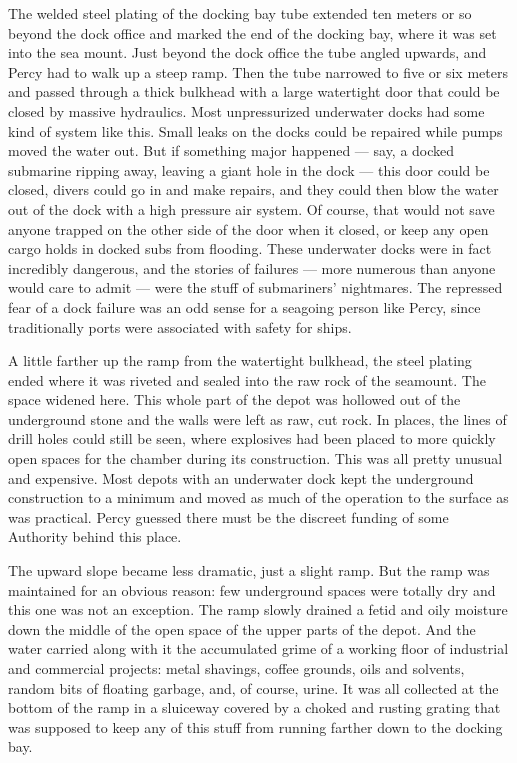 \documentclass[
]{scrbook}
\begin{document}
\bigskip

The welded steel plating of the docking bay tube extended ten meters or
so beyond the dock office and marked the end of the docking bay, where
it was set into the sea mount. Just beyond the dock office the tube
angled upwards, and Percy had to walk up a steep ramp. Then the tube
narrowed to five or six meters and passed through a thick bulkhead with
a large watertight door that could be closed by massive hydraulics. Most
unpressurized underwater docks had some kind of system like this. Small
leaks on the docks could be repaired while pumps moved the water out.
But if something major happened --- say, a docked submarine ripping
away, leaving a giant hole in the dock --- this door could be closed,
divers could go in and make repairs, and they could then blow the water
out of the dock with a high pressure air system. Of course, that would
not save anyone trapped on the other side of the door when it closed, or
keep any open cargo holds in docked subs from flooding. These underwater
docks were in fact incredibly dangerous, and the stories of failures ---
more numerous than anyone would care to admit --- were the stuff of
submariners' nightmares. The repressed fear of a dock failure was an odd
sense for a seagoing person like Percy, since traditionally ports were
associated with safety for ships.

A little farther up the ramp from the watertight bulkhead, the steel
plating ended where it was riveted and sealed into the raw rock of the
seamount. The space widened here. This whole part of the depot was
hollowed out of the underground stone and the walls were left as raw,
cut rock. In places, the lines of drill holes could still be seen, where
explosives had been placed to more quickly open spaces for the chamber
during its construction. This was all pretty unusual and expensive. Most
depots with an underwater dock kept the underground construction to a
minimum and moved as much of the operation to the surface as was
practical. Percy guessed there must be the discreet funding of some
Authority behind this place.

The upward slope became less dramatic, just a slight ramp. But the ramp
was maintained for an obvious reason: few underground spaces were
totally dry and this one was not an exception. The ramp slowly drained a
fetid and oily moisture down the middle of the open space of the upper
parts of the depot. And the water carried along with it the accumulated
grime of a working floor of industrial and commercial projects: metal
shavings, coffee grounds, oils and solvents, random bits of floating
garbage, and, of course, urine. It was all collected at the bottom of
the ramp in a sluiceway covered by a choked and rusting grating that was
supposed to keep any of this stuff from running farther down to the
docking bay.
\end{document}
